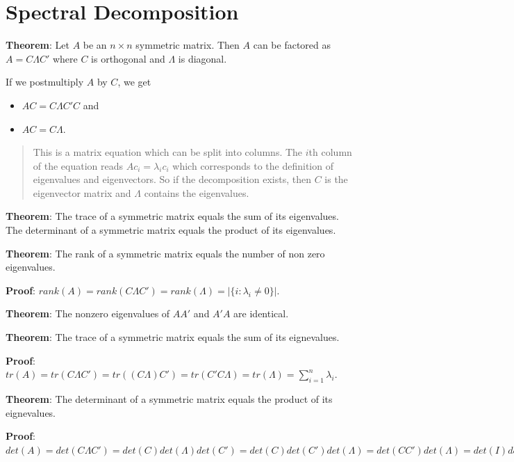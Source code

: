\documentclass[12pt,]{book}
\providecommand{\tightlist}{%
  \setlength{\itemsep}{0pt}\setlength{\parskip}{0pt}}
\begin{document}
\hypertarget{spectral-decomposition}{%
\section{Spectral Decomposition}\label{spectral-decomposition}}

\textbf{Theorem}:
Let \(A\) be an \(n \times n\) symmetric matrix. Then \(A\) can be factored as \(A = C \Lambda C'\) where \(C\) is orthogonal and \(\Lambda\) is diagonal.

If we postmultiply \(A\) by \(C\), we get

\begin{itemize}
\tightlist
\item
  \(AC = C \Lambda C'C\) and
\item
  \(AC = C \Lambda\).
\end{itemize}

\begin{quote}
This is a matrix equation which can be split into columns. The \(i\)th column of the equation reads \(A c_i = \lambda_i c_i\) which corresponds to the definition of eigenvalues and eigenvectors. So if the decomposition exists, then \(C\) is the eigenvector matrix and \(\Lambda\) contains the eigenvalues.
\end{quote}

\textbf{Theorem}:
The trace of a symmetric matrix equals the sum of its eigenvalues. The determinant of a symmetric matrix equals the product of its eigenvalues.

\textbf{Theorem}:
The rank of a symmetric matrix equals the number of non zero eigenvalues.

\textbf{Proof}:
\(rank(A) = rank(C\Lambda C') = rank(\Lambda) = | \{i: \lambda_i \neq 0 \}|\).
\[\tag*{$\blacksquare$}\]

\textbf{Theorem}:
The nonzero eigenvalues of \(AA'\) and \(A'A\) are identical.

\textbf{Theorem}:
The trace of a symmetric matrix equals the sum of its eignevalues.

\textbf{Proof}:
\(tr(A) = tr(C \Lambda C') = tr((C \Lambda)C') = tr(C'C \Lambda) = tr(\Lambda) = \sum_ {i=1}^n \lambda_i.\)
\[\tag*{$\blacksquare$}\]

\textbf{Theorem}:
The determinant of a symmetric matrix equals the product of its eignevalues.

\textbf{Proof}:
\(det(A) = det(C \Lambda C') = det(C)det(\Lambda)det(C') = det(C)det(C')det(\Lambda) = det(CC') det(\Lambda) = det(I)det(\Lambda) = det(\Lambda) = \prod_ {i=1}^n \lambda_i.\)
\[\tag*{$\blacksquare$}\]
\end{document}
